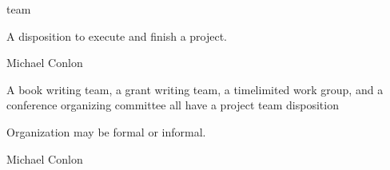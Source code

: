 \documentclass[letterpaper,10pt,english]{sphinxmanual}
\begin{document}
\begin{sphinxShadowBox}

\sphinxAtStartPar
team
\end{sphinxShadowBox}

\begin{sphinxShadowBox}

\sphinxAtStartPar
{\hyperref[\detokenize{doc-BFO_0000016::doc}]{}}
\end{sphinxShadowBox}

\begin{sphinxShadowBox}

\sphinxAtStartPar
A disposition to execute and finish a project.
\end{sphinxShadowBox}

\begin{sphinxShadowBox}

\sphinxAtStartPar
Michael Conlon 
\end{sphinxShadowBox}

\begin{sphinxShadowBox}

\sphinxAtStartPar
A book writing team, a grant writing team, a time\sphinxhyphen{}limited work group, and a conference organizing committee all have a project team disposition
\end{sphinxShadowBox}

\begin{sphinxShadowBox}

\sphinxAtStartPar
Organization may be formal or informal.
\end{sphinxShadowBox}

\begin{sphinxShadowBox}

\sphinxAtStartPar
Michael Conlon 
\end{sphinxShadowBox}
\begin{quote}

\ignorespaces \end{quote}
\end{document}
